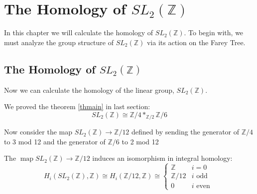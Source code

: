 \newpage
\section{The Homology of $SL_2(\mathbb{Z})$ }

In this chapter we will calculate the homology of $SL_2(\mathbb{Z})$. To begin with, we must analyze the group structure of $SL_2(\mathbb{Z})$ via its action on the Farey Tree.



\subsection{The Homology of $SL_2(\mathbb{Z})$}
Now we can calculate the homology of the linear group, $SL_2(\mathbb{Z})$.
\par
We proved the theorem \ref{thmain} in last section:
\[
S L_{2}(\mathbb{Z}) \cong \mathbb{Z} / 4 *_{\mathbb{Z} / 2} \mathbb{Z} / 6
\]
\par
Now consider the map $S L_{2}(\mathbb{Z}) \rightarrow \mathbb{Z} / 12$ defined by sending the generator of $\mathbb{Z} / 4$ to 3 mod 12 and the generator of $\mathbb{Z} / 6$ to 2 mod 12
\begin{theorem}
\label{thm3}
The $\operatorname{map} S L_{2}(\mathbb{Z}) \longrightarrow \mathbb{Z} / 12$ induces an isomorphism in integral homology:
\[
H_{i}\left(S L_{2}(\mathbb{Z}), \mathbb{Z}\right) \cong H_{i}(\mathbb{Z} / 12, \mathbb{Z}) \cong\left\{\begin{array}{ll}
\mathbb{Z} & i=0 \\
\mathbb{Z} / 12 & i \text { odd } \\
0 & i \text { even }
\end{array}\right.
\]
\end{theorem}
